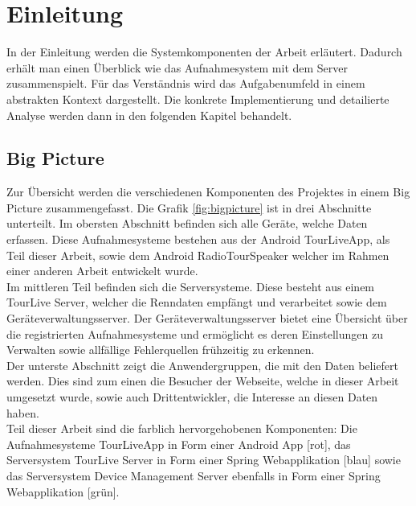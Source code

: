 \chapter{Einleitung}

In der Einleitung werden die Systemkomponenten der Arbeit erläutert. Dadurch erhält man einen Überblick wie das Aufnahmesystem mit dem Server zusammenspielt. Für das Verständnis wird das Aufgabenumfeld in einem abstrakten Kontext dargestellt. Die konkrete Implementierung und detailierte Analyse werden dann in den folgenden Kapitel behandelt.

\section{Big Picture}
Zur Übersicht werden die verschiedenen Komponenten des Projektes in einem Big Picture zusammengefasst. Die Grafik \ref{fig:bigpicture} ist in drei Abschnitte unterteilt. Im obersten Abschnitt befinden sich alle Geräte, welche Daten erfassen. Diese Aufnahmesysteme bestehen aus der Android TourLiveApp, als Teil dieser Arbeit, sowie dem Android RadioTourSpeaker welcher im Rahmen einer anderen Arbeit entwickelt wurde.\\
Im mittleren Teil befinden sich die Serversysteme. Diese besteht aus einem TourLive Server, welcher die Renndaten empfängt und verarbeitet sowie dem Geräteverwaltungsserver. Der Geräteverwaltungsserver bietet eine Übersicht über die registrierten Aufnahmesysteme und ermöglicht es deren Einstellungen zu Verwalten sowie allfällige Fehlerquellen frühzeitig zu erkennen.\\
Der unterste Abschnitt zeigt die Anwendergruppen, die mit den Daten beliefert werden. Dies sind zum einen die Besucher der Webseite, welche in dieser Arbeit umgesetzt wurde, sowie auch Drittentwickler, die Interesse an diesen Daten haben.\\
Teil dieser Arbeit sind die farblich hervorgehobenen Komponenten: Die Aufnahmesysteme TourLiveApp in Form einer Android App [rot], das Serversystem TourLive Server in Form einer Spring Webapplikation [blau] sowie das Serversystem Device Management Server ebenfalls in Form einer Spring Webapplikation [grün].

